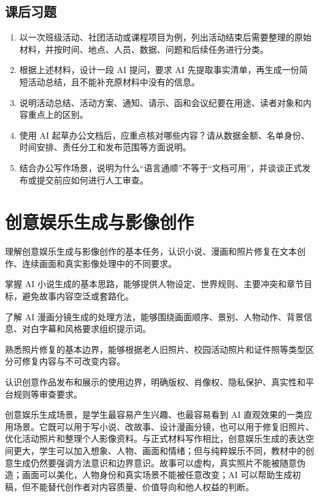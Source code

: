\subsection*{课后习题}
\begin{enumerate}
\setlength{\itemsep}{6pt}

\item 以一次班级活动、社团活动或课程项目为例，列出活动结束后需要整理的原始材料，并按时间、地点、人员、数据、问题和后续任务进行分类。

\item 根据上述材料，设计一段 AI 提问，要求 AI 先提取事实清单，再生成一份简短活动总结，且不能补充原材料中没有的信息。

\item 说明活动总结、活动方案、通知、请示、函和会议纪要在用途、读者对象和内容重点上的区别。

\item 使用 AI 起草办公文档后，应重点核对哪些内容？请从数据金额、名单身份、时间安排、责任分工和发布范围等方面说明。

\item 结合办公写作场景，说明为什么“语言通顺”不等于“文档可用”，并谈谈正式发布或提交前应如何进行人工审查。

\end{enumerate}

\newpage

\section{创意娱乐生成与影像创作}

\begin{sectionkeypoints}
\item 理解创意娱乐生成与影像创作的基本任务，认识小说、漫画和照片修复在文本创作、连续画面和真实影像处理中的不同要求。
\item 掌握 AI 小说生成的基本思路，能够提供人物设定、世界规则、主要冲突和章节目标，避免故事内容空泛或套路化。
\item 了解 AI 漫画分镜生成的处理方法，能够围绕画面顺序、景别、人物动作、背景信息、对白字幕和风格要求组织提示词。
\item 熟悉照片修复的基本边界，能够根据老人旧照片、校园活动照片和证件照等类型区分可修复内容与不可改变内容。
\item 认识创意作品发布和展示的使用边界，明确版权、肖像权、隐私保护、真实性和平台规则等审查要求。
\end{sectionkeypoints}

创意娱乐生成场景，是学生最容易产生兴趣、也最容易看到 AI 直观效果的一类应用场景。它既可以用于写小说、改故事、设计漫画分镜，也可以用于修复旧照片、优化活动照片和整理个人影像资料。与正式材料写作相比，创意娱乐生成的表达空间更大，学生可以加入想象、人物、画面和情绪；但与纯粹娱乐不同，教材中的创意生成仍然要强调方法意识和边界意识。故事可以虚构，真实照片不能被随意伪造；画面可以美化，人物身份和真实场景不能被任意改变；AI 可以帮助生成初稿，但不能替代创作者对内容质量、价值导向和他人权益的判断。

